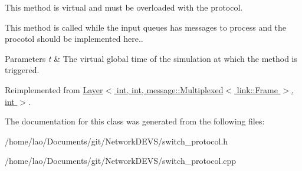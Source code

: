 This method is virtual and must be overloaded with the protocol. 

This method is called while the input queues has messages to process and the procotol should be implemented here..


\begin{DoxyParams}{Parameters}
{\em t} & The virtual global time of the simulation at which the method is triggered. \\
\hline
\end{DoxyParams}


Reimplemented from \hyperlink{classLayer_a1c82b14ba3efc37969f55c633a9b3173}{Layer$<$ int, int, message\+::\+Multiplexed$<$ link\+::\+Frame $>$, int $>$}.



The documentation for this class was generated from the following files\+:\begin{DoxyCompactItemize}
\item 
/home/lao/\+Documents/git/\+Network\+D\+E\+V\+S/switch\+\_\+protocol.\+h\item 
/home/lao/\+Documents/git/\+Network\+D\+E\+V\+S/switch\+\_\+protocol.\+cpp\end{DoxyCompactItemize}
